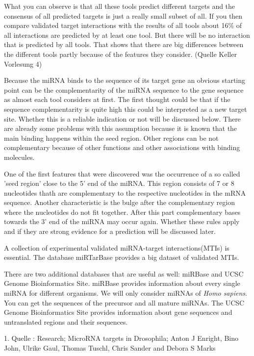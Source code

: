 \documentclass[12pt]{article}
\begin{document}
What you can observe is that all these tools predict different targets and the consensus of all predicted targets is just a really small subset of all. If you then compare validated target interactions with the results of all tools about 16\% of all interactions are predicted by at least one tool. But there will be no interaction that is predicted by all tools. That shows that there are big differences between the different tools partly because of the features they consider. (Quelle Keller Vorlesung 4) 

Because the miRNA binds to the sequence of its target gene an obvious starting point can be the complementarity of the miRNA sequence to the gene sequence as almost each tool considers at first. The first thought could be that if the sequence complementarity is quite high this could be interpreted as a new target site. Whether this is a reliable indication or not will be discussed below. There are already some problems with this assumption because it is known that the main binding happens within the seed region. Other regions can be not complementary because of other functions and other associations with binding molecules.

One of the first features that were discovered was the occurrence of a so called 'seed region' close to the 5' end of the miRNA. This region consists of 7 or 8 nucleotides thath are complementary to the respective nucleotides in the mRNA sequence. Another characteristic is the bulge after the complementary region where the nucleotides do not fit together. After this part complementary bases towards the 3' end of the miRNA may occur again. Whether these rules apply and if they are strong evidence for a prediction will be discussed later. 

A collection of experimental validated miRNA-target interactions(MTIs) is essential. The database miRTarBase provides a big dataset of validated MTIs. 

There are two additional databases that are useful as well: miRBase and UCSC Genome Bioinformatics Site. miRBase provides information about every single miRNA for different organisms. We will only consider miRNAs of \textit{Homo sapiens}. You can get the sequences of the precursor and all mature miRNAs. The UCSC Genome Bioinformatics Site provides information about gene sequences and untranslated regions and their sequences.
 
1. Quelle : Research; MicroRNA targets in Drosophila; Anton J Enright, Bino John, Ulrike Gaul, Thomas Tuschl, Chris Sander and Debora S Marks \\
\\
\end{document}
